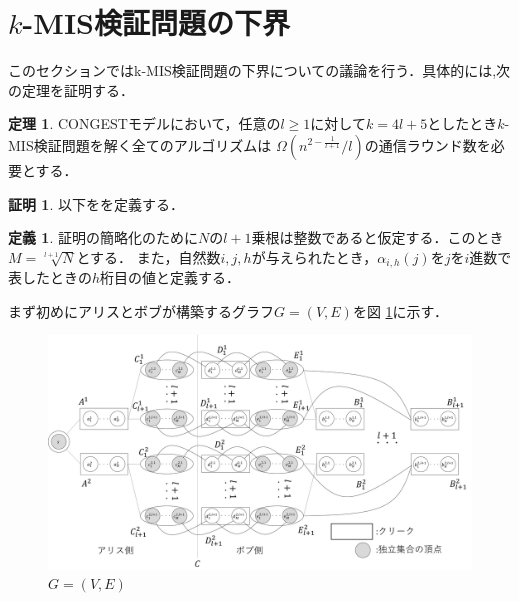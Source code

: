\documentclass[12pt]{thesis}
\newcommand{\CONGEST}{\textsf{CONGEST}}
\theoremstyle{definition}
\newtheorem{theorem}{定理}[chapter]
\newtheorem{definition}{定義}[chapter]
\newtheorem*{prf*}{証明}
\begin{document}
\newpage

\section{$k$-MIS検証問題の下界}
このセクションではk-MIS検証問題の下界についての議論を行う．具体的には,次の定理を証明する．
\begin{theorem}
{\CONGEST}モデルにおいて，任意の$l \geq 1$に対して$k = 4l + 5$としたとき$k$-MIS検証問題を解く全てのアルゴリズムは
$\Omega\left(n^{2 - \frac{1}{l+1}}/l\right)$の通信ラウンド数を必要とする．
\end{theorem}

\begin{prf*}
以下をを定義する．
\begin{definition}
証明の簡略化のために$N$の$l + 1$乗根は整数であると仮定する．このとき$M = \sqrt[l + 1]{N}$とする．
また，自然数$i, j, h$が与えられたとき，$\alpha_{i, h}(j)$を$j$を$i$進数で表したときの$h$桁目の値と定義する．
\end{definition}
まず初めにアリスとボブが構築するグラフ$G = (V, E)$を図 \ref{k_G}に示す．

\begin{figure}[ht]
\begin{center}
\includegraphics[width=120mm]{k_G.png}
\end{center}
\caption{$G = (V, E)$}
\label{k_G}
\end{figure}


\end{prf*}
\end{document}
